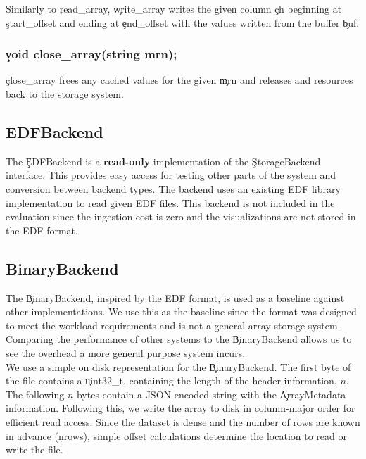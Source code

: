 Similarly to \c{read\_array}, \c{write\_array} writes the given column \c{ch}
beginning at \c{start\_offset} and ending at \c{end\_offset} with the values
written from the buffer \c{buf}.

\subsubsection{\c{void close\_array(string mrn);}}

\c{close\_array} frees any cached values for the given \c{mrn} and releases
and resources back to the storage system.

\subsection{EDFBackend}

The \c{EDFBackend} is a \textbf{read-only} implementation of the \c{StorageBackend}
interface. This provides easy access for testing other parts of the system and
conversion between backend types. The backend uses an existing EDF library
implementation \cite{edflib} to read given EDF files. This backend is not
included in the evaluation since the ingestion cost is zero and the
visualizations are not stored in the EDF format.

\subsection{BinaryBackend}\label{storage-ch:implementation-binary}

The \c{BinaryBackend}, inspired by the EDF format, is used as a baseline
against other implementations. We use this as the baseline since the format was
designed to meet the workload requirements and is not a general array storage
system. Comparing the performance of other systems to the \c{BinaryBackend}
allows us to see the overhead a more general purpose system incurs. \\

We use a simple on disk representation for the \c{BinaryBackend}. The first
byte of the file contains a \c{uint32\_t}, containing the length of the header
information, $n$. The following $n$ bytes contain a JSON encoded string with
the \c{ArrayMetadata} information. Following this, we write the array to disk
in column-major order for efficient read access. Since the dataset is dense and
the number of rows are known in advance (\c{nrows}), simple offset
calculations determine the location to read or write the file. \\

